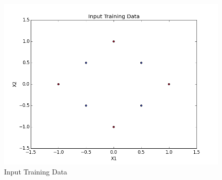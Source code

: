 \documentclass[10pt, letterpaper]{article}
\begin{document}
\begin{figure}[h!]
\centering
\includegraphics[scale=0.75]{InputData.png}
\caption{Input Training Data}
\label{fig:Input}
\end{figure}
\end{document}
